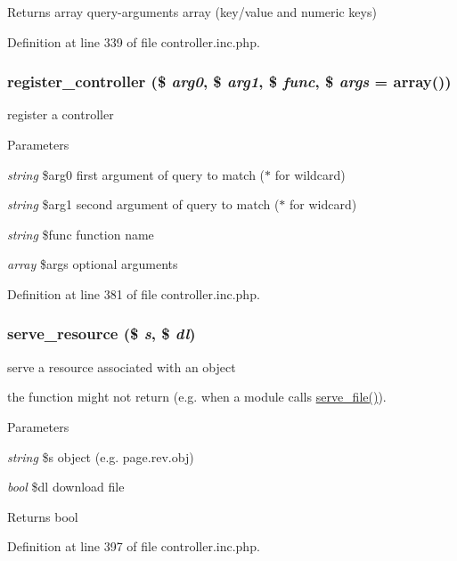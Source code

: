 \begin{DoxyReturn}{Returns}
array query-\/arguments array (key/value and numeric keys) 
\end{DoxyReturn}


Definition at line 339 of file controller.inc.php.

\hypertarget{controller_8inc_8php_a543961dbcd309fa2cb6a887a8666bf1c}{
\subsubsection[{register\_\-controller}]{\setlength{\rightskip}{0pt plus 5cm}register\_\-controller (\$ {\em arg0}, \/  \$ {\em arg1}, \/  \$ {\em func}, \/  \$ {\em args} = {\ttfamily array()})}}
\label{controller_8inc_8php_a543961dbcd309fa2cb6a887a8666bf1c}
register a controller


\begin{DoxyParams}{Parameters}
\item[{\em string}]\$arg0 first argument of query to match ($\ast$ for wildcard) \item[{\em string}]\$arg1 second argument of query to match ($\ast$ for widcard) \item[{\em string}]\$func function name \item[{\em array}]\$args optional arguments \end{DoxyParams}


Definition at line 381 of file controller.inc.php.

\hypertarget{controller_8inc_8php_a5d5274c3531eb05a1ea5927ff3cd08d3}{
\subsubsection[{serve\_\-resource}]{\setlength{\rightskip}{0pt plus 5cm}serve\_\-resource (\$ {\em s}, \/  \$ {\em dl})}}
\label{controller_8inc_8php_a5d5274c3531eb05a1ea5927ff3cd08d3}
serve a resource associated with an object

the function might not return (e.g. when a module calls \hyperlink{util_8inc_8php_a43278b320bd522e46bd7abdd3a2f6fb0}{serve\_\-file()}). 
\begin{DoxyParams}{Parameters}
\item[{\em string}]\$s object (e.g. page.rev.obj) \item[{\em bool}]\$dl download file \end{DoxyParams}
\begin{DoxyReturn}{Returns}
bool 
\end{DoxyReturn}


Definition at line 397 of file controller.inc.php.

